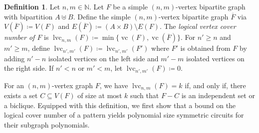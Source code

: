 \documentclass[11pt, DIV=15]{scrarticle}
\theoremstyle{definition}
\newtheorem{definition}{Definition}[section]
\theoremstyle{plain}
\theoremstyle{remark}
\DeclareMathOperator{\vc}{vc}
\DeclareMathOperator{\cc}{lvc}
\begin{document}
\begin{definition}
	\label{def:bcc}
	Let $n,m \in \mathbb{N}$.
	Let $F$ be a simple $(n,m)$-vertex bipartite graph with bipartition $A \uplus B$.
	Define the simple $(n,m)$-vertex bipartite graph $\overline{F}$ via $V(\overline{F}) \coloneqq V(F)$ and $E(\overline{F}) \coloneqq (A \times B) \setminus E(F)$.
	The \emph{logical vertex cover number of $F$} is
	$
	\cc_{n,m}(F) \coloneqq \min\{\vc(F), \vc(\overline{F})\}.
	$
	For $n' \geq n$ and $m' \geq m$, define $\cc_{n',m'}(F) \coloneqq \cc_{n',m'}(F')$ where $F'$ is obtained from $F$ by adding $n'-n$ isolated vertices on the left side and $m'-m$ isolated vertices on the right side.
	If $n' < n$ or $m' < m$, let $\cc_{n',m'}(F) \coloneqq 0$.
\end{definition}



	
	For an $(n,m)$-vertex graph $F$, we have $\cc_{n,m}(F) = k$ if, and only if, there exists a set $C \subseteq V(F)$ of size at most $k$ such that $F - C$ is an independent set or a biclique.
	Equipped with this definition,
	we first show that a bound on the logical cover number of a pattern yields polynomial size symmetric circuits for their subgraph polynomials.
	
\end{document}
